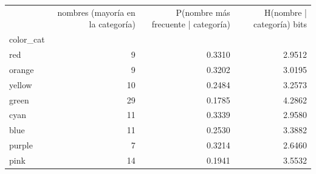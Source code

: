 \begin{tabular}{lrrr}
\toprule
 & nombres (mayoría en la categoría) & P(nombre más frecuente | categoría) & H(nombre | categoría) bits \\
color\_cat &  &  &  \\
\midrule
red & 9 & 0.3310 & 2.9512 \\
orange & 9 & 0.3202 & 3.0195 \\
yellow & 10 & 0.2484 & 3.2573 \\
green & 29 & 0.1785 & 4.2862 \\
cyan & 11 & 0.3339 & 2.9580 \\
blue & 11 & 0.2530 & 3.3882 \\
purple & 7 & 0.3214 & 2.6460 \\
pink & 14 & 0.1941 & 3.5532 \\
\bottomrule
\end{tabular}
